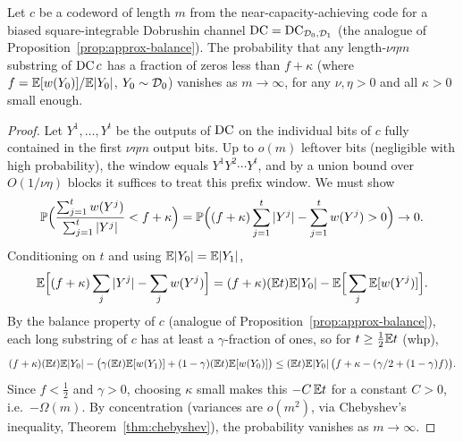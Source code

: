 \begin{lemma}
  \label{lem:buffer-balance}
  \notready
  Let $c$ be a codeword of length $m$ from the near-capacity-achieving code for a
  biased square-integrable Dobrushin channel $\mathrm{DC}=\mathrm{DC}_{\mathcal{D}_0,\mathcal{D}_1}$
  (the analogue of Proposition~\ref{prop:approx-balance}). The probability that
  any length-$\nu\eta m$ substring of $\mathrm{DC}\,c$ has a fraction of zeros less
  than $f+\kappa$ (where $f=\mathbb{E}[w(Y_0)]/\mathbb{E}|Y_0|$, $Y_0\sim\mathcal{D}_0$) vanishes as
  $m\to\infty$, for any $\nu,\eta>0$ and all $\kappa>0$ small enough.
\end{lemma}
\begin{proof}
  Let $Y^1,\dots,Y^t$ be the outputs of $\mathrm{DC}$ on the individual bits of $c$
  fully contained in the first $\nu\eta m$ output bits. Up to $o(m)$ leftover bits
  (negligible with high probability), the window equals
  $Y^1Y^2\cdots Y^t$, and by a union bound over $O(1/\nu\eta)$ blocks it suffices
  to treat this prefix window. We must show
  \[
    \mathbb{P}\Big(\frac{\sum_{j=1}^t w(Y^j)}{\sum_{j=1}^t|Y^j|}<f+\kappa\Big)
      = \mathbb{P}\Big((f+\kappa)\sum_{j=1}^t|Y^j|-\sum_{j=1}^t w(Y^j)>0\Big)\to0.
  \]
  Conditioning on $t$ and using $\mathbb{E}|Y_0|=\mathbb{E}|Y_1|$,
  \[
    \mathbb{E}\Big[(f+\kappa)\sum_j|Y^j|-\sum_j w(Y^j)\Big]
      = (f+\kappa)(\mathbb{E} t)\mathbb{E}|Y_0|-\mathbb{E}\Big[\sum_j \mathbb{E}[w(Y^j)]\Big].
  \]
  By the balance property of $c$ (analogue of
  Proposition~\ref{prop:approx-balance}), each long substring of $c$ has at least
  a $\gamma$-fraction of ones, so for $t\ge\tfrac12\mathbb{E} t$ (whp),
  \[
    (f+\kappa)(\mathbb{E} t)\mathbb{E}|Y_0|-\big(\gamma(\mathbb{E} t)\mathbb{E}[w(Y_1)]+(1-\gamma)(\mathbb{E} t)\mathbb{E}[w(Y_0)]\big)
      \le (\mathbb{E} t)\mathbb{E}|Y_0|\,\big(f+\kappa-(\gamma/2+(1-\gamma)f)\big).
  \]
  Since $f<\tfrac12$ and $\gamma>0$, choosing $\kappa$ small makes this $-C\,\mathbb{E} t$
  for a constant $C>0$, i.e.\ $-\Omega(m)$. By concentration (variances are $o(m^2)$,
  via Chebyshev's inequality, Theorem~\ref{thm:chebyshev}), the probability
  vanishes as $m\to\infty$.
\end{proof}

